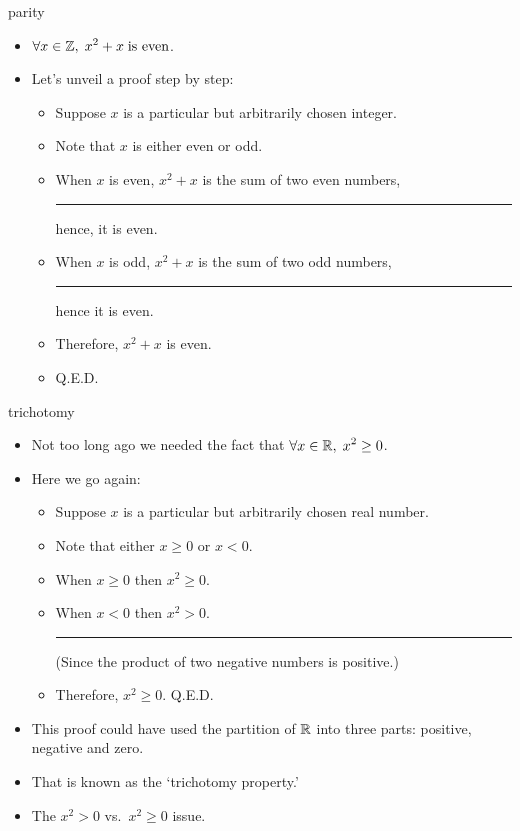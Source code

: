 \documentclass[landscape]{beamer}
\begin{document}
\begin{frame}{parity}
\begin{itemize}
\item $\displaystyle \forall x \in {\mathbb Z}, \; x^2+x \; \mbox{is even}$. \pause
\item Let's unveil a proof step by step:\pause
\begin{itemize}
\item Suppose $x$ is a particular but arbitrarily chosen integer. \pause
\item Note that $x$ is either even or odd. \pause {} \pause \pause
\item When $x$ is even, $x^2 + x$ is the sum of two even numbers, \newline \rule{12pt}{0pt} hence, it is even. \pause
\item When $x$ is odd, $x^2 + x$ is the sum of two odd numbers, \newline \rule{12pt}{0pt} hence it is even.\pause
\item Therefore, $x^2+x$ is even.\pause
\item \hfill Q.E.D. 
\end{itemize}
\end{itemize}
\end{frame}

\begin{frame}{trichotomy}
\begin{itemize}
\item Not too long ago we needed the fact that $\displaystyle \forall x \in {\mathbb R}, \; x^2 \geq 0$. \pause
\item Here we go again: \pause
\begin{itemize}
\item Suppose $x$ is a particular but arbitrarily chosen real number. \pause
\item Note that either $x\geq 0$ or $x<0$. \pause
\item When $x \geq 0$ then $x^2 \geq 0$. \pause
\item When $x < 0$ then $x^2 > 0$. \pause \newline \rule{12pt}{0pt} (Since the product of two negative numbers is positive.) \pause
\item Therefore, $x^2 \geq 0$. \hfill Q.E.D. \pause
\end{itemize}
\item This proof could have used the partition of ${\mathbb R}$ into three parts: positive, negative and zero. \pause
\item That is known as the `trichotomy property.' \pause
\item The $x^2 > 0$ vs.\ $x^2 \geq 0$ issue.
\end{itemize}
\end{frame}
\end{document}
